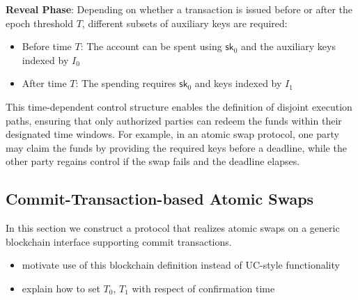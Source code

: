 \textbf{Reveal Phase}: Depending on whether a transaction is issued before or after the epoch threshold $T$, different subsets of auxiliary keys are required:
\begin{itemize}
    \item Before time $T$: The account can be spent using $\mathsf{sk}_0$ and the auxiliary keys indexed by $I_0$
    \item After time $T$: The spending requires $\mathsf{sk}_0$ and keys indexed by $I_1$
\end{itemize}
This time-dependent control structure enables the definition of disjoint execution paths, ensuring that only authorized parties can redeem the funds within their designated time windows. For example, in an atomic swap protocol, one party may claim the funds by providing the required keys before a deadline, while the other party regains control if the swap fails and the deadline elapses.

\subsection{Commit-Transaction-based Atomic Swaps}
In this section we construct a protocol that realizes atomic swaps on a generic blockchain interface supporting commit transactions.

\begin{todobox}
\begin{itemize}
\item motivate use of this blockchain definition instead of UC-style functionality
\item explain how to set $T_0$, $T_1$ with respect of confirmation time
\end{itemize}
\end{todobox}

